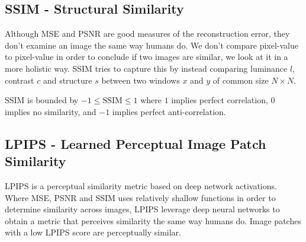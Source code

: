 \subsection{SSIM - Structural Similarity}
Although MSE and PSNR are good measures of the reconstruction error, they don't examine an image the same way humans do. We don't compare pixel-value to pixel-value in order to conclude if two images are similar, we look at it in a more holistic way. SSIM tries to capture this by instead comparing luminance $l$, contrast $c$ and structure $s$ between two windows $x$ and $y$ of common size $N \times N$.



\begin{comment}
\begin{itemize}
    \item $\mu$ represents the pixel sample mean for both $x$ and $y$,
    \item $\sigma^2$ represents the variance for both $x$ and $y$,
    \item $\sigma_{xy}$ represents the covariance of x and y,
    \item $c_1 = (k_1L)^2$, $c_2 = (k_2L)^2$ are variables to stabilize the division with weak denominator,
    \item $L$ represents the dynamic range of the pixel-values,
    \item $k_1 = 0.01$, $k_2 = 0.03$ by default   
\end{itemize}
\end{comment}

SSIM is bounded by $-1 \leq \text{SSIM} \leq 1$ where $1$ implies perfect correlation, $0$ implies no similarity, and $-1$ implies perfect anti-correlation.

\subsection{LPIPS - Learned Perceptual Image Patch Similarity}
LPIPS \cite{zhang_unreasonable_2018} is a perceptual similarity metric based on deep network activations. Where MSE, PSNR and SSIM uses relatively shallow functions in order to determine similarity across images, LPIPS leverage deep neural networks to obtain a metric that perceives similarity the same way humans do. Image patches with a low LPIPS score are perceptually similar.





